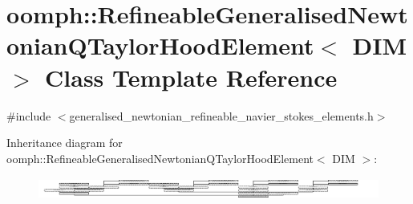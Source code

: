 \hypertarget{classoomph_1_1RefineableGeneralisedNewtonianQTaylorHoodElement}{}\section{oomph\+:\+:Refineable\+Generalised\+Newtonian\+Q\+Taylor\+Hood\+Element$<$ D\+IM $>$ Class Template Reference}
\label{classoomph_1_1RefineableGeneralisedNewtonianQTaylorHoodElement}


{\ttfamily \#include $<$generalised\+\_\+newtonian\+\_\+refineable\+\_\+navier\+\_\+stokes\+\_\+elements.\+h$>$}

Inheritance diagram for oomph\+:\+:Refineable\+Generalised\+Newtonian\+Q\+Taylor\+Hood\+Element$<$ D\+IM $>$\+:\begin{figure}[H]
\begin{center}
\leavevmode
\includegraphics[height=0.717029cm]{classoomph_1_1RefineableGeneralisedNewtonianQTaylorHoodElement}
\end{center}
\end{figure}
